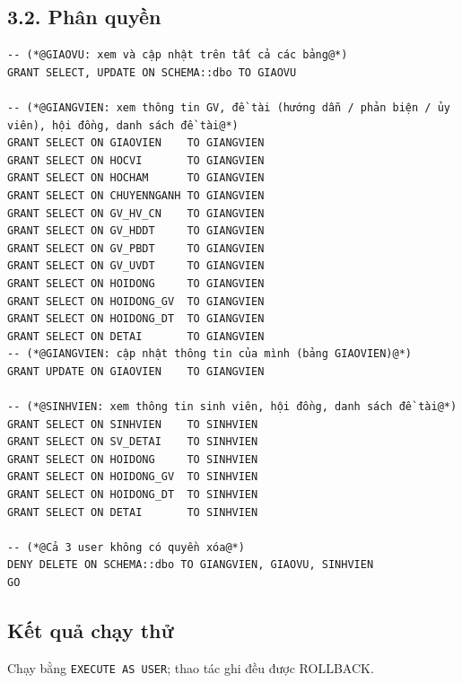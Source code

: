 \documentclass[12pt,a4paper]{article}
\begin{document}
\subsection*{3.2. Phân quyền}
\begin{lstlisting}
-- (*@GIAOVU: xem và cập nhật trên tất cả các bảng@*)
GRANT SELECT, UPDATE ON SCHEMA::dbo TO GIAOVU

-- (*@GIANGVIEN: xem thông tin GV, đề tài (hướng dẫn / phản biện / ủy viên), hội đồng, danh sách đề tài@*)
GRANT SELECT ON GIAOVIEN    TO GIANGVIEN
GRANT SELECT ON HOCVI       TO GIANGVIEN
GRANT SELECT ON HOCHAM      TO GIANGVIEN
GRANT SELECT ON CHUYENNGANH TO GIANGVIEN
GRANT SELECT ON GV_HV_CN    TO GIANGVIEN
GRANT SELECT ON GV_HDDT     TO GIANGVIEN
GRANT SELECT ON GV_PBDT     TO GIANGVIEN
GRANT SELECT ON GV_UVDT     TO GIANGVIEN
GRANT SELECT ON HOIDONG     TO GIANGVIEN
GRANT SELECT ON HOIDONG_GV  TO GIANGVIEN
GRANT SELECT ON HOIDONG_DT  TO GIANGVIEN
GRANT SELECT ON DETAI       TO GIANGVIEN
-- (*@GIANGVIEN: cập nhật thông tin của mình (bảng GIAOVIEN)@*)
GRANT UPDATE ON GIAOVIEN    TO GIANGVIEN

-- (*@SINHVIEN: xem thông tin sinh viên, hội đồng, danh sách đề tài@*)
GRANT SELECT ON SINHVIEN    TO SINHVIEN
GRANT SELECT ON SV_DETAI    TO SINHVIEN
GRANT SELECT ON HOIDONG     TO SINHVIEN
GRANT SELECT ON HOIDONG_GV  TO SINHVIEN
GRANT SELECT ON HOIDONG_DT  TO SINHVIEN
GRANT SELECT ON DETAI       TO SINHVIEN

-- (*@Cả 3 user không có quyền xóa@*)
DENY DELETE ON SCHEMA::dbo TO GIANGVIEN, GIAOVU, SINHVIEN
GO
\end{lstlisting}

\subsection*{Kết quả chạy thử}
Chạy bằng \texttt{EXECUTE AS USER}; thao tác ghi đều được ROLLBACK.
\end{document}

